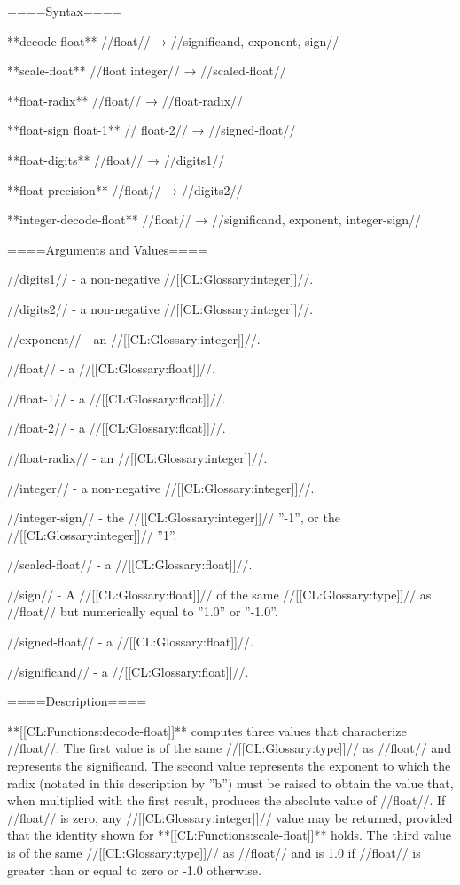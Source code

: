 
====Syntax====

**decode-float** //float// → //significand, exponent, sign//

**scale-float** //float integer// → //scaled-float//

**float-radix** //float// → //float-radix//

**float-sign {float-1** //\opt} float-2// → //signed-float//

**float-digits** //float// → //digits1//

**float-precision** //float// → //digits2//

**integer-decode-float** //float// → //significand, exponent, integer-sign//

====Arguments and Values====

//digits1// - a non-negative //[[CL:Glossary:integer]]//.

//digits2// - a non-negative //[[CL:Glossary:integer]]//.

//exponent// - an //[[CL:Glossary:integer]]//.

//float// - a //[[CL:Glossary:float]]//.

//float-1// - a //[[CL:Glossary:float]]//.

//float-2// - a //[[CL:Glossary:float]]//.

//float-radix// - an //[[CL:Glossary:integer]]//.

//integer// - a non-negative //[[CL:Glossary:integer]]//.

//integer-sign// - the //[[CL:Glossary:integer]]// ''-1'', or the //[[CL:Glossary:integer]]// ''1''.

//scaled-float// - a //[[CL:Glossary:float]]//.

//sign// - A //[[CL:Glossary:float]]// of the same //[[CL:Glossary:type]]// as //float// but numerically equal to ''1.0'' or ''-1.0''.

//signed-float// - a //[[CL:Glossary:float]]//.

//significand// - a //[[CL:Glossary:float]]//.

====Description====

**[[CL:Functions:decode-float]]** computes three values that characterize //float//. The first value is of the same //[[CL:Glossary:type]]// as //float// and represents the significand. The second value represents the exponent to which the radix (notated in this description by ''b'') must be raised to obtain the value that, when multiplied with the first result, produces the absolute value of //float//. If //float// is zero, any //[[CL:Glossary:integer]]// value may be returned, provided that the identity shown for **[[CL:Functions:scale-float]]** holds. The third value is of the same //[[CL:Glossary:type]]// as //float// and is 1.0 if //float// is greater than or equal to zero or -1.0 otherwise.

